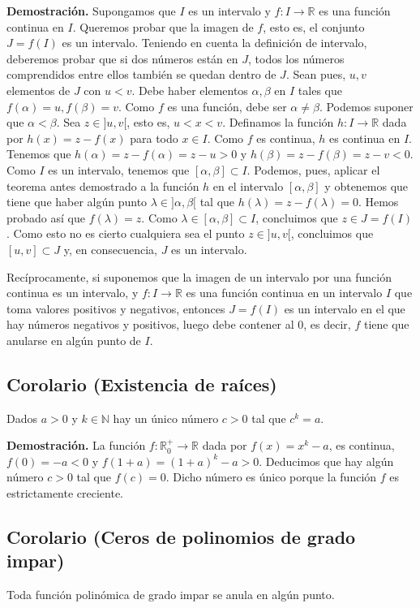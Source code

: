 \documentclass[10pt,a4paper]{article}
\begin{document}
	\textbf{Demostración. }Supongamos que $I$ es un intervalo y $f: I \rightarrow \mathbb{R}$ es una función continua en $I$. Queremos probar que la imagen de $f$, esto es, el conjunto $J = f(I)$ es un intervalo. Teniendo en cuenta la definición de intervalo, deberemos probar que si dos números están en $J$, todos los números comprendidos entre ellos también se quedan dentro de $J$. Sean pues, $u, v$ elementos de $J$ con $u < v$. Debe haber elementos $\alpha, \beta$ en $I$ tales que $f(\alpha) = u, f(\beta) = v$. Como $f$ es una función, debe ser $\alpha \neq \beta$. Podemos suponer que $\alpha < \beta$. Sea $z \in ]u, v[$, esto es, $u < x < v$. Definamos la función $h: I \rightarrow \mathbb{R}$ dada por $h(x) = z - f(x)$ para todo $x \in I$. Como $f$ es continua, $h$ es continua en $I$. Tenemos que $h (\alpha) = z - f(\alpha) = z - u > 0$ y $h(\beta) = z - f(\beta) = z - v < 0$. Como $I$ es un intervalo, tenemos que $[\alpha, \beta] \subset I$. Podemos, pues, aplicar el teorema antes demostrado a la función $h$ en el intervalo $[\alpha, \beta]$ y obtenemos que tiene que haber algún punto $\lambda \in ]\alpha, \beta[$ tal que $h(\lambda) = z - f(\lambda) = 0$. Hemos probado así que $f(\lambda) = z$. Como $\lambda \in [\alpha, \beta] \subset I$, concluimos que $z \in J = f(I)$. Como esto no es cierto cualquiera sea el punto $z \in ]u, v[$, concluimos que $[u, v] \subset J$ y, en consecuencia, $J$ es un intervalo.
	
	Recíprocamente, si suponemos que la imagen de un intervalo por una función continua es un intervalo, y $f: I \rightarrow \mathbb{R}$ es una función continua en un intervalo $I$ que toma valores positivos y negativos, entonces $J = f(I)$ es un intervalo en el que hay números negativos y positivos, luego debe contener al $0$, es decir, $f$ tiene que anularse en algún punto de $I$.
	
	\subsection{Corolario (Existencia de raíces)}
	Dados $a > 0$ y $k \in \mathbb{N}$ hay un único número $c > 0$ tal que $c^k = a$.
	
	\textbf{Demostración. }La función $f: \mathbb{R}_0 ^+ \rightarrow \mathbb{R}$ dada por $f(x) = x^k - a$, es continua, $f(0) = -a < 0$ y $f(1+a) = (1+a)^k -a > 0$. Deducimos que hay algún número $c > 0$ tal que $f(c) = 0$. Dicho número es único porque la función $f$ es estrictamente creciente.
	
	\subsection{Corolario (Ceros de polinomios de grado impar)}
	Toda función polinómica de grado impar se anula en algún punto.
	
\end{document}
